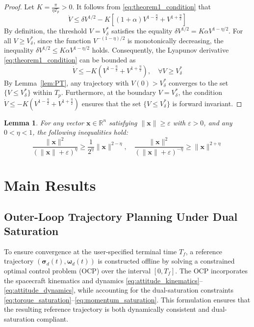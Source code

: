 \documentclass[journal]{new-aiaa}
\newtheorem{lemma}{Lemma}
\begin{document}
\begin{proof}
Let $K = \frac{\pi}{\eta T_p} > 0$. It follows from \eqref{eq:theorem1_condition} that
\begin{equation}
\dot V \le \delta V^{1/2} - K \left[ (1+\alpha)V^{1-\frac{\eta}{2}} + V^{1+\frac{\eta}{2}} \right]
\end{equation}
By definition, the threshold $V = V^*_\delta$ satisfies the equality $\delta V^{1/2} = K\alpha V^{1-\eta/2}$. For all $V \ge V^*_\delta$, since the function $V^{-(1-\eta)/2}$ is monotonically decreasing, the inequality $\delta V^{1/2} \le K\alpha V^{1-\eta/2}$ holds. Consequently, the Lyapunov derivative \eqref{eq:theorem1_condition} can be bounded as
\begin{equation}
\dot V \le -K \left( V^{1-\frac{\eta}{2}} + V^{1+\frac{\eta}{2}} \right), \quad \forall V \ge V^*_\delta
\end{equation}
By Lemma~\ref{lem:PT}, any trajectory with $V(0)>V^*_\delta$ converges to the set $\{V\le V^*_\delta\}$ within $T_p$.
Furthermore, at the boundary $V=V^*_\delta$, the condition $\dot V\le -K\left(V^{1-\tfrac{\eta}{2}}+V^{1+\tfrac{\eta}{2}}\right)$
ensures that the set $\{V\le V^*_\delta\}$ is forward invariant.
\end{proof}

\begin{lemma}\label{lem:norm_ineq}
For any vector $\boldsymbol{x}\in\mathbb{R}^n$ satisfying $\|\boldsymbol{x}\|\ge\varepsilon$ with $\varepsilon>0$, and any $0<\eta<1$, the following inequalities hold:
\begin{equation}
\frac{\|\boldsymbol{x}\|^2}{(\|\boldsymbol{x}\|+\varepsilon)^\eta} \ge \frac{1}{2^\eta} \|\boldsymbol{x}\|^{2-\eta}, \quad
\frac{\|\boldsymbol{x}\|^2}{(\|\boldsymbol{x}\|+\varepsilon)^{-\eta}} \ge \|\boldsymbol{x}\|^{2+\eta}
\end{equation}
\end{lemma}


\section{Main Results}
\label{section:MAINRES}

\subsection{Outer-Loop Trajectory Planning Under Dual Saturation}

To ensure convergence at the user-specified terminal time $T_f$, a reference trajectory $(\boldsymbol{\sigma}_d(t), \boldsymbol{\omega}_d(t))$ is constructed offline by solving a constrained optimal control problem (OCP) over the interval $[0, T_f]$. The OCP incorporates the spacecraft kinematics and dynamics \eqref{eq:attitude_kinematics}--\eqref{eq:attitude_dynamics}, while accounting for the dual-saturation constraints \eqref{eq:torque_saturation}--\eqref{eq:momentum_saturation}. This formulation ensures that the resulting reference trajectory is both dynamically consistent and dual-saturation compliant.
\end{document}
